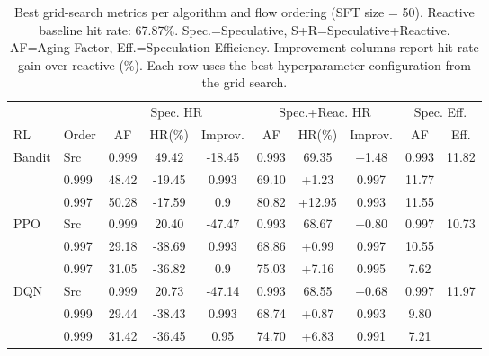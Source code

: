\begin{table}[t]
\centering
\caption{Best grid-search metrics per algorithm and flow ordering (SFT size = 50). Reactive baseline hit rate: 67.87\%. Spec.=Speculative, S+R=Speculative+Reactive. AF=Aging Factor, Eff.=Speculation Efficiency. Improvement columns report hit-rate gain over reactive (\%). Each row uses the best hyperparameter configuration from the grid search.}
\label{tab:unified-grid-metrics-tablesize50}
\small
\begin{tabular}{@{}llcccccccc@{}}
\toprule
& & \multicolumn{3}{c}{Spec. HR} & \multicolumn{3}{c}{Spec.+Reac. HR} & \multicolumn{2}{c}{Spec. Eff.} \\
\cmidrule(lr){3-5} \cmidrule(lr){6-8} \cmidrule(lr){9-10}
RL & Order & AF & HR(\%) & Improv. & AF & HR(\%) & Improv. & AF & Eff. \\
\midrule
\multirow{3}{*}{Bandit} & Src & 0.999 & 49.42 & -18.45 & 0.993 & 69.35 & +1.48 & 0.993 & 11.82 \\
Dest & 0.999 & 48.42 & -19.45 & 0.993 & 69.10 & +1.23 & 0.997 & 11.77 \\
Trace & 0.997 & 50.28 & -17.59 & 0.9 & 80.82 & +12.95 & 0.993 & 11.55 \\
\multirow{3}{*}{PPO} & Src & 0.999 & 20.40 & -47.47 & 0.993 & 68.67 & +0.80 & 0.997 & 10.73 \\
Dest & 0.997 & 29.18 & -38.69 & 0.993 & 68.86 & +0.99 & 0.997 & 10.55 \\
Trace & 0.997 & 31.05 & -36.82 & 0.9 & 75.03 & +7.16 & 0.995 & 7.62 \\
\multirow{3}{*}{DQN} & Src & 0.999 & 20.73 & -47.14 & 0.993 & 68.55 & +0.68 & 0.997 & 11.97 \\
Dest & 0.999 & 29.44 & -38.43 & 0.993 & 68.74 & +0.87 & 0.993 & 9.80 \\
Trace & 0.999 & 31.42 & -36.45 & 0.95 & 74.70 & +6.83 & 0.991 & 7.21 \\
\bottomrule
\end{tabular}
\end{table}
